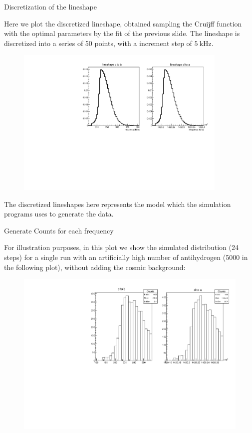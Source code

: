 \documentclass[8pt]{beamer}
\newcommand{\nologo}{\setbeamertemplate{logo}{}}
\begin{document}
{\nologo
\begin{frame}{Discretization of the lineshape}

Here we plot the discretized lineshape, obtained sampling the Cruijff function with the optimal parameters by the fit of the previous slide. The lineshape is discretized into a series of 50 points, with a increment step of $\SI{5}{\kilo \hertz}$.

\begin{figure}[hbtp]
\centering
\includegraphics[width = 0.9\textwidth]{../LineShape/Plot/CruijffLineShapes.pdf}
\end{figure}

The discretized lineshapes here represents the model which the simulation programs uses to generate the data. 
\end{frame}

\begin{frame}{Generate Counts for each frequency}

For illustration purposes, in this plot we show the simulated distribution (24 steps) for a single run with an artificially high number of antihydrogen (5000 in the following plot), without adding the cosmic background:

\begin{figure}[hbtp]
\centering
\includegraphics[width = \textwidth]{../LineShape/Plot/LineshapeSampled.pdf}
\end{figure}
\end{frame}
}
\end{document}
